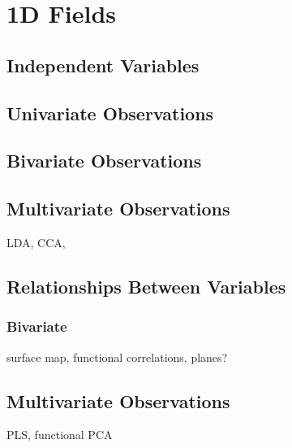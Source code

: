 \documentclass[../main.tex]{subfiles}
\begin{document}
\section{1D Fields}

\subsection{Independent Variables}

\subsection{Univariate Observations}

\subsection{Bivariate Observations}

\subsection{Multivariate Observations}
LDA, CCA, 
\subsection{Relationships Between Variables}

\subsubsection{Bivariate}
surface map, functional correlations, planes?
\subsection{Multivariate Observations}
PLS, functional PCA
\end{document}
